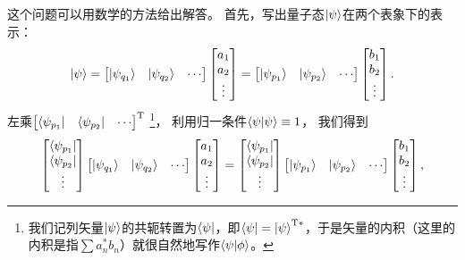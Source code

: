 这个问题可以用数学的方法给出解答。
首先，写出量子态$\ket{\psi}$在两个表象下的表示：
\begin{equation}
    \ket{\psi} =
    \begin{bmatrix}
        \ket{\psi_{q_1}} & \ket{\psi_{q_2}} & \cdots
    \end{bmatrix}
    \begin{bmatrix}
        a_1 \\ a_2 \\ \vdots
    \end{bmatrix}
    =
    \begin{bmatrix}
        \ket{\psi_{p_1}} & \ket{\psi_{p_2}} & \cdots
    \end{bmatrix}
    \begin{bmatrix}
        b_1 \\ b_2 \\ \vdots
    \end{bmatrix}.
\end{equation}
左乘$
\begin{bmatrix}
    \bra{\psi_{p_1}} & \bra{\psi_{p_2}} & \cdots
\end{bmatrix}^{\mathrm{T}}$
\footnote{我们记列矢量$\ket{\psi}$的共轭转置为$\bra{\psi}$，即$\bra{\psi}=\ket{\psi}^{\mathrm{T}*}$，于是矢量的内积（这里的内积是指$\sum a_n^* b_n$）就很自然地写作$\braket{\psi}{\phi}$。}，
利用归一条件$\braket{\psi}{\psi}\equiv 1$，
我们得到
\begin{equation}
    \begin{bmatrix}
        \bra{\psi_{p_1}} \\ \bra{\psi_{p_2}} \\ \vdots
    \end{bmatrix}
    \begin{bmatrix}
        \ket{\psi_{q_1}} & \ket{\psi_{q_2}} & \cdots
    \end{bmatrix}
    \begin{bmatrix}
        a_1 \\ a_2 \\ \vdots
    \end{bmatrix}
    =
    \begin{bmatrix}
        \bra{\psi_{p_1}} \\ \bra{\psi_{p_2}} \\ \vdots
    \end{bmatrix}
    \begin{bmatrix}
        \ket{\psi_{p_1}} & \ket{\psi_{p_2}} & \cdots
    \end{bmatrix}
    \begin{bmatrix}
        b_1 \\ b_2 \\ \vdots
    \end{bmatrix},
\end{equation}
